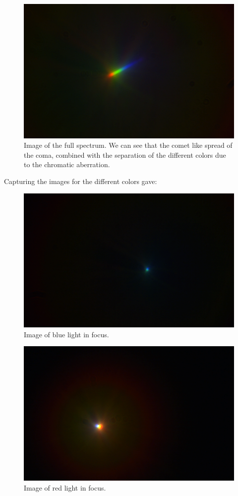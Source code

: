 \documentclass{emulateapj}
\begin{document}
\begin{figure}[H]
\centering
\includegraphics[scale=0.2]{spekter.png}
\caption{Image of the full spectrum. We can see that the comet like spread of the coma, combined with the separation of the different colors due to the chromatic aberration.}
\label{img:spekter}
\end{figure}

Capturing the images for the different colors gave:

\begin{figure}[H]
\centering
\includegraphics[scale=0.2]{blatt.png}
\caption{Image of blue light in focus.}
\label{img:blue}
\end{figure}
\begin{figure}[H]
\centering
\includegraphics[scale=0.2]{rod_fokus.png}
\caption{Image of red light in focus.}
\label{img:red}
\end{figure}
\end{document}
